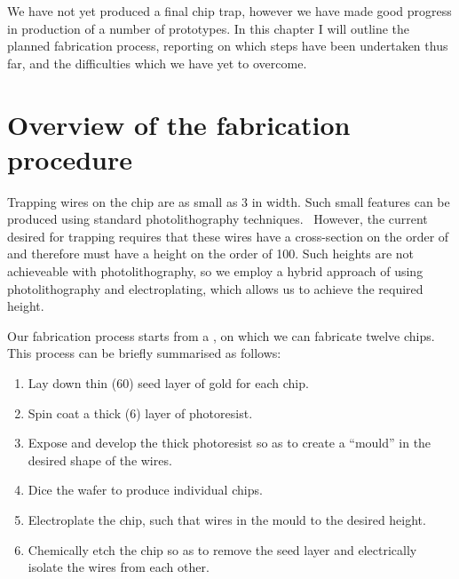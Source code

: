 We have not yet produced a final chip trap, however we have made good progress
in production of a number of prototypes. In this chapter I will outline the
planned fabrication process, reporting on which steps have been undertaken thus
far, and the difficulties which we have yet to overcome.

\section{Overview of the fabrication procedure}

Trapping wires on the chip are as small as \si{3}{\micro\meter} in width. Such
small features can be produced using standard photolithography
techniques.~\cite{} However, the current desired for trapping requires that
these wires have a cross-section on the order of  and therefore must
have a height on the order of \si{100}{\micro\meter}. Such heights are not
achieveable with photolithography, so we employ a hybrid approach of using
photolithography and electroplating, which allows us to achieve the required
height.

Our fabrication process starts from a , on which we can fabricate twelve  chips. This process
can be briefly summarised as follows:
\begin{enumerate}
\item Lay down thin (\si{60}{\nano\meter}) seed layer of gold for each chip.
\item Spin coat a thick (\si{6}{\micro\meter}) layer of photoresist.
\item Expose and develop the thick photoresist so as to create a ``mould''
in the desired shape of the wires.
\item Dice the wafer to produce individual chips.
\item Electroplate the chip, such that wires  in the mould to the
desired height.
\item Chemically etch the chip so as to remove the seed layer and
electrically isolate the wires from each other.
\end{enumerate}
